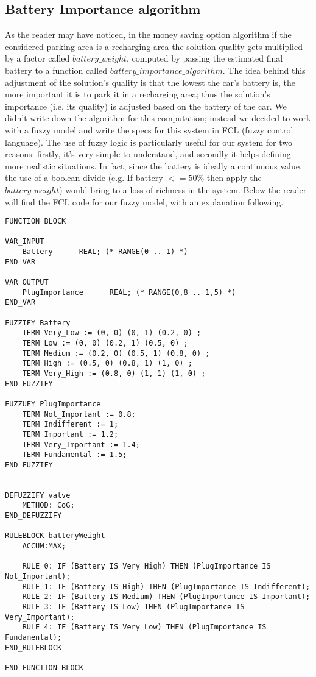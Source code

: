 \subsection{Battery Importance algorithm}
As the reader may have noticed, in the money saving option algorithm if the considered parking area is a recharging area the solution quality gets multiplied by a factor called $battery\_weight$, computed by passing the estimated final battery to a function called $battery\_importance\_algorithm$. 
The idea behind this adjustment of the solution's quality is that the lowest the car's battery is, the more important it is to park it in a recharging area; thus the solution's importance (i.e. its quality) is adjusted based on the battery of the car. 
We didn't write down the algorithm for this computation; instead we decided to work with a fuzzy model and write the specs for this system in FCL (fuzzy control language). The use of fuzzy logic is particularly useful for our system for two reasons: firstly, it's very simple to understand, and secondly it helps defining more realistic situations. In fact, since the battery is ideally a continuous value, the use of a boolean divide (e.g. If battery $<=50\%$ then apply the $battery\_weight$) would bring to a loss of richness in the system.
Below the reader will find the FCL code for our fuzzy model, with an explanation following.


\begin{verbatim}
FUNCTION_BLOCK

VAR_INPUT
    Battery      REAL; (* RANGE(0 .. 1) *) 
END_VAR

VAR_OUTPUT
    PlugImportance      REAL; (* RANGE(0,8 .. 1,5) *) 
END_VAR

FUZZIFY Battery
    TERM Very_Low := (0, 0) (0, 1) (0.2, 0) ;
    TERM Low := (0, 0) (0.2, 1) (0.5, 0) ;
    TERM Medium := (0.2, 0) (0.5, 1) (0.8, 0) ;
    TERM High := (0.5, 0) (0.8, 1) (1, 0) ;
    TERM Very_High := (0.8, 0) (1, 1) (1, 0) ;
END_FUZZIFY

FUZZUFY PlugImportance
    TERM Not_Important := 0.8;
    TERM Indifferent := 1;
    TERM Important := 1.2;
    TERM Very_Important := 1.4;
    TERM Fundamental := 1.5;
END_FUZZIFY


DEFUZZIFY valve 
    METHOD: CoG;
END_DEFUZZIFY

RULEBLOCK batteryWeight
    ACCUM:MAX;

    RULE 0: IF (Battery IS Very_High) THEN (PlugImportance IS Not_Important);
    RULE 1: IF (Battery IS High) THEN (PlugImportance IS Indifferent);
    RULE 2: IF (Battery IS Medium) THEN (PlugImportance IS Important);
    RULE 3: IF (Battery IS Low) THEN (PlugImportance IS Very_Important);
    RULE 4: IF (Battery IS Very_Low) THEN (PlugImportance IS Fundamental);
END_RULEBLOCK

END_FUNCTION_BLOCK
\end{verbatim}

